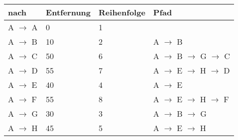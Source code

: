 \documentclass{lehramt-informatik-aufgabe}
\begin{document}
\begin{enumerate}
\begin{liAntwort}
\begin{tabular}{llll}
\bf{nach}                                         & \bf{Entfernung}                                   & \bf{Reihenfolge}                                  & \bf{Pfad}                                         \\
\hline
A  $\rightarrow$  A                               & 0                                                 & 1                                                 &                                                   \\
A  $\rightarrow$  B                               & 10                                                & 2                                                 & A $\rightarrow$ B                                 \\
A  $\rightarrow$  C                               & 50                                                & 6                                                 & A $\rightarrow$ B $\rightarrow$ G $\rightarrow$ C \\
A  $\rightarrow$  D                               & 55                                                & 7                                                 & A $\rightarrow$ E $\rightarrow$ H $\rightarrow$ D \\
A  $\rightarrow$  E                               & 40                                                & 4                                                 & A $\rightarrow$ E                                 \\
A  $\rightarrow$  F                               & 55                                                & 8                                                 & A $\rightarrow$ E $\rightarrow$ H $\rightarrow$ F \\
A  $\rightarrow$  G                               & 30                                                & 3                                                 & A $\rightarrow$ B $\rightarrow$ G                 \\
A  $\rightarrow$  H                               & 45                                                & 5                                                 & A $\rightarrow$ E $\rightarrow$ H                 \\
\end{tabular}
\end{liAntwort}
\end{enumerate}
\end{document}
